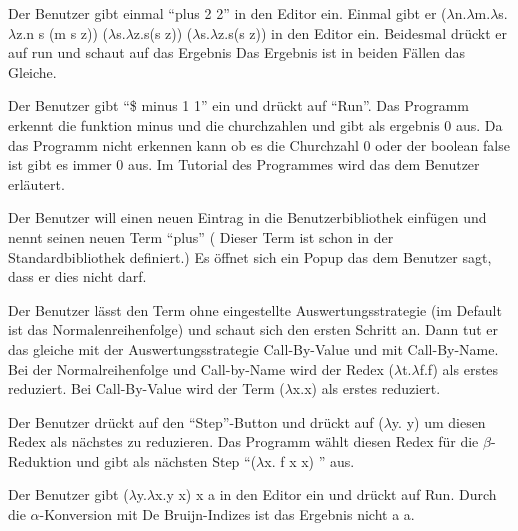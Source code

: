\documentclass[parskip=full,11pt,twoside]{scrartcl}
\begin{document}
{Der Benutzer gibt einmal \enquote{plus 2 2} in den Editor ein. Einmal gibt er ($\lambda$n.$\lambda$m.$\lambda$s.$\lambda$z.n s (m s z)) ($\lambda$s.$\lambda$z.s(s z)) ($\lambda$s.$\lambda$z.s(s z)) in den Editor ein. Beidesmal drückt er auf run und schaut auf das Ergebnis}
{Das Ergebnis ist in beiden Fällen das Gleiche. }

{Der Benutzer gibt \enquote{\$ minus 1 1} ein und drückt auf \enquote{Run}.}
{Das Programm erkennt die funktion minus und die churchzahlen und gibt als ergebnis 0 aus. Da das Programm nicht erkennen kann ob es die Churchzahl 0 oder der boolean false ist gibt es immer 0 aus. Im Tutorial des Programmes wird das dem Benutzer erläutert. }

{Der Benutzer will einen neuen Eintrag in die Benutzerbibliothek einfügen und nennt seinen neuen Term \enquote{plus} ( Dieser Term ist schon in der Standardbibliothek definiert.) }
{Es öffnet sich ein Popup das dem Benutzer sagt, dass er dies nicht darf.}



{Der Benutzer lässt den Term ohne eingestellte Auswertungsstrategie (im Default ist das Normalenreihenfolge) und schaut sich den ersten Schritt an. Dann tut er das gleiche mit der Auswertungsstrategie Call-By-Value und mit Call-By-Name.}
{ Bei der Normalreihenfolge und Call-by-Name wird der Redex ($\lambda$t.$\lambda$f.f) als erstes reduziert. Bei Call-By-Value wird der Term ($\lambda$x.x) als erstes reduziert. }

{Der Benutzer drückt auf den \enquote{Step}-Button und drückt auf ($\lambda$y. y) um diesen Redex als nächstes zu reduzieren.}
{Das Programm wählt diesen Redex für die $\beta$-Reduktion und gibt als nächsten Step \enquote{($\lambda$x. f x x) } aus.}


{Der Benutzer gibt ($\lambda$y.$\lambda$x.y x) x a in den Editor ein und drückt auf Run.}
{Durch die $\alpha$-Konversion mit De Bruijn-Indizes ist das Ergebnis nicht a a.}
\end{document}
